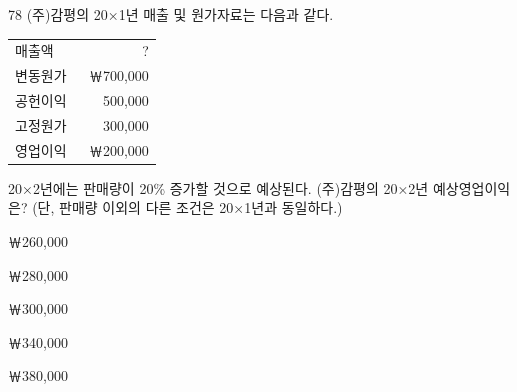 \begin{question}{78}
(주)감평의 20×1년 매출 및 원가자료는 다음과 같다.

{\small\centering\begin{tabular}{|p{0.5\linewidth}|r|}\hline
매출액 & ? \\
변동원가 & ￦700,000 \\ \hline
공헌이익 & 500,000 \\
고정원가 & 300,000 \\ \hline
영업이익 & ￦200,000 \\ \hline
\end{tabular}\par}
\vspace{4pt}
20×2년에는 판매량이 20\% 증가할 것으로 예상된다. (주)감평의 20×2년 예상영업이익은? (단, 판매량 이외의 다른 조건은 20×1년과 동일하다.)
\begin{choices}
  \item ￦260,000
  \item ￦280,000
  \item ￦300,000
  \item ￦340,000
  \item ￦380,000
\end{choices}
\end{question}
